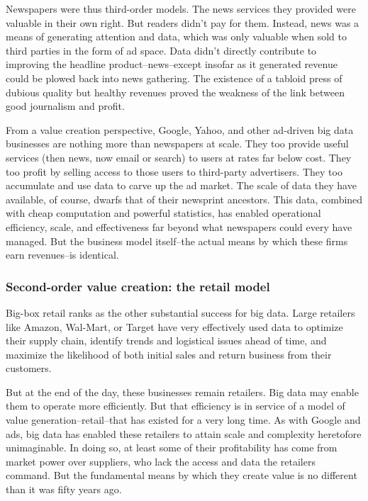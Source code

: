 \documentclass[12pt]{article}
\begin{document}
Newspapers were thus third-order models. The news services they
provided were valuable in their own right. But readers didn't pay for
them. Instead, news was a means of generating attention and data,
which was only valuable when sold to third parties in the form of ad
space. Data didn't directly contribute to improving the headline
product--news--except insofar as it generated revenue could be plowed
back into news gathering. The existence of a tabloid press of dubious
quality but healthy revenues proved the weakness of the link between
good journalism and profit.

From a value creation perspective, Google, Yahoo, and other ad-driven
big data businesses are nothing more than newspapers at scale. They
too provide useful services (then news, now email or search) to users
at rates far below cost. They too profit by selling access to those
users to third-party advertisers. They too accumulate and use data to
carve up the ad market. The scale of data they have available, of
course, dwarfs that of their newsprint ancestors. This data, combined
with cheap computation and powerful statistics, has enabled
operational efficiency, scale, and effectiveness far beyond what
newspapers could every have managed. But the business model
itself--the actual means by which these firms earn revenues--is
identical.

\subsubsection{Second-order value creation: the retail model}
\label{sec:second-order-value}


Big-box retail ranks as the other substantial success for big
data. Large retailers like Amazon, Wal-Mart, or Target have very
effectively used data to optimize their supply chain, identify trends
and logistical issues ahead of time, and maximize the likelihood of
both initial sales and return business from their customers. 

But at the end of the day, these businesses remain retailers. Big data
may enable them to operate more efficiently. But that efficiency is in
service of a model of value generation--retail--that has existed for a
very long time. As with Google and ads, big data has enabled these
retailers to attain scale and complexity heretofore unimaginable. In
doing so, at least some of their profitability has come from market
power over suppliers, who lack the access and data the retailers
command. But the fundamental means by which they create value is no
different than it was fifty years ago.
\end{document}
